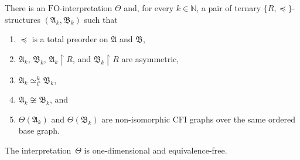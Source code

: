 \documentclass[]{lmcs}
\newcommand{\nat}{\mathbb{N}}
\newcommand{\iso}{\cong}
\newcommand{\set}[1]{\lbrace #1 \rbrace}
\newcommand{\interpret}{\Theta}
\newcommand{\spleq}{\preceq}
\newcommand{\StructA}{\mathfrak{A}}
\newcommand{\StructB}{\mathfrak{B}}
\newcommand{\reduct}[2]{#1 \upharpoonright #2}
\newcommand{\FO}{\ensuremath{\mathrm{FO}}}
\newcommand{\kequiv}[1]{\simeq^#1_{\mathcal{C}}}
\begin{document}
\begin{thm}
	\label{thm:asymmetric-structures-with-CFI graphs}
	There is an \FO{}-interpretation $\interpret$
	and, for every $k \in \nat$, a pair of ternary $\set{R,\spleq}$-structures $(\StructA_k, \StructB_k)$
	such that
	\begin{enumerate}[label=(\alph*)]
		\item $\spleq$ is a total preorder on $\StructA$ and $\StructB$,
		\item $\StructA_k$, $\StructB_k$, $\reduct{\StructA_k}{R}$, and $\reduct{\StructB_k}{R}$ are asymmetric,
		\item $\StructA_k \kequiv{k} \StructB_k$,
		\item $\StructA_k \not\iso \StructB_k$, and
		\item $\interpret(\StructA_k)$ and $\interpret(\StructB_k)$
		are non-isomorphic CFI graphs over the same ordered base graph.
	\end{enumerate}
	The interpretation~$\interpret$ is one-dimensional and equivalence-free.
\end{thm}
\end{document}
